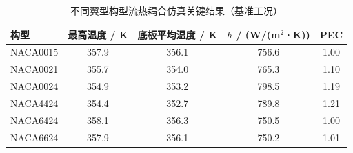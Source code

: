 \documentclass[stage2,fontset=fandol]{ydzjreport}
\begin{document}
\begin{table}[H]
\centering
\caption{不同翼型构型流热耦合仿真关键结果（基准工况）}
\label{tab:airfoil}
\begin{tabularx}{\textwidth}{@{}l c c c c@{}}
\toprule
\rowcolor{ydzjlight} 构型 & 最高温度 / K & 底板平均温度 / K & $h$ / (W/(m$^2$·K)) & PEC \\
\midrule
NACA0015 & 357.9 & 356.1 & 756.6 & 1.00 \\
NACA0021 & 355.7 & 354.0 & 765.3 & 1.10 \\
NACA0024 & 354.9 & 353.2 & 798.5 & 1.19 \\
NACA4424 & 354.4 & 352.7 & 789.8 & 1.21 \\
NACA6424 & 358.1 & 356.3 & 750.5 & 1.00 \\
NACA6624 & 357.9 & 356.1 & 750.2 & 1.01 \\
\bottomrule
\end{tabularx}
\end{table}
\clearpage
\setcounter{table}{2}
\end{document}
